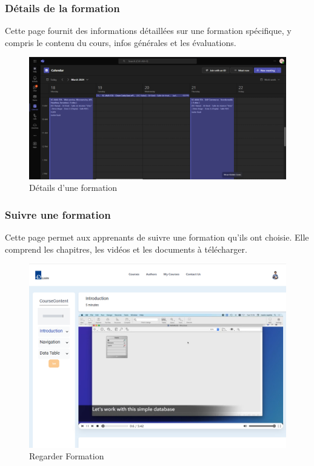 \subsubsection{Détails de la formation}

Cette page fournit des informations détaillées sur une formation spécifique, y compris le contenu du cours, infos générales et les évaluations.

\begin{figure}[H]
    \centering
    \includegraphics[width=19cm]{Figures/formation.png}
    \caption{Détails d'une formation}
\end{figure}

\subsubsection{Suivre une formation}

Cette page permet aux apprenants de suivre une formation qu'ils ont choisie. Elle comprend les chapitres, les vidéos et les documents à télécharger.

\begin{figure}[H]
    \centering
    \includegraphics[width=19cm]{Figures/video.png}
    \caption{Regarder Formation}
\end{figure}

